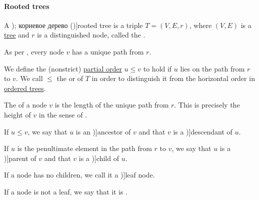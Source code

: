 \paragraph{Rooted trees}

\begin{definition}\label{def:rooted_tree}
  A \term[ru=ориентированное дерево (\cite[323]{ЕмеличевИПр1990Графы}); корневое дерево (\cite[\S 9.2.1]{Новиков2013ДискретнаяМатематика})]{rooted tree} is a triple \( T = (V, E, r) \), where \( (V, E) \) is a \hyperref[def:tree]{tree} and \( r \) is a distinguished node, called the .

  As per , every node \( v \) has a unique path from \( r \).

  \begin{thmenum}
     We define the (nonstrict) \hyperref[def:partially_ordered_set]{partial order} \( u \leq v \) to hold if \( u \) lies on the path from \( r \) to \( v \). We call \( \leq \) the  or  of \( T \) in order to distinguish it from the horizontal order in \hyperref[def:ordered_tree]{ordered trees}.

     The  of a node \( v \) is the length of the unique path from \( r \). This is precisely the height of \( v \) in the sense of .

     If \( u \leq v \), we say that \( u \) is an \term[ru=предок (\cite[298]{БелоусовТкачёв2004ДискретнаяМатематика})]{ancestor} of \( v \) and that \( v \) is a \term[ru=потомок (\cite[298]{БелоусовТкачёв2004ДискретнаяМатематика})]{descendant} of \( u \).

     If \( u \) is the penultimate element in the path from \( r \) to \( v \), we say that \( u \) is a \term[ru=отец (\cite[298]{БелоусовТкачёв2004ДискретнаяМатематика})]{parent} of \( v \) and that \( v \) is a \term[ru=сын (\cite[298]{БелоусовТкачёв2004ДискретнаяМатематика})]{child} of \( u \).

     If a node has no children, we call it a \term[ru=лист (\cite[298]{БелоусовТкачёв2004ДискретнаяМатематика})]{leaf node}.

     If a node is not a leaf, we say that it is .


\end{thmenum}
\end{definition}
